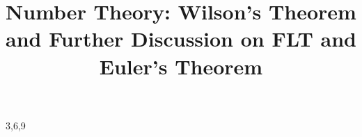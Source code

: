\documentclass[a4paper,12pt]{article}
\begin{document}

\title{Number Theory: Wilson's Theorem and Further Discussion on FLT and Euler's Theorem}
\newcommand\event{S.3,4 Elite Mathematics Training}
\newcommand\learningobjective{
\item Learn Wilson's Theorem
\item Further understanding of Fermat's Little Theorem and Euler's Theorem 
}

\myfrontpage





\mynewpage

\begin{question}[]{3,6,9}
    
    
    
    
    
    
    
    
\end{question}

\begin{question}{1}
    
    
    
    
\end{question}
\end{document}

